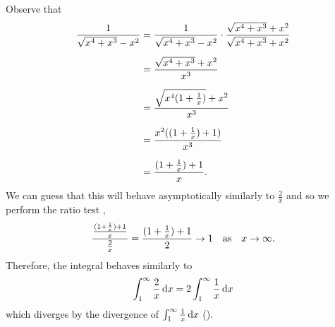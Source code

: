 \documentclass[../MathsNotesBase.tex]{subfiles}
\begin{document}
{\begin{exe}
{				Observe that
				\[\begin{aligned}
					\frac{1}{\sqrt{x^4 + x^3} - x^2} &= \frac{1}{\sqrt{x^4 + x^3} - x^2} \cdot \frac{\sqrt{x^4 + x^3} + x^2}{\sqrt{x^4 + x^3} + x^2} \nn
					&= \frac{\sqrt{x^4 + x^3} + x^2}{x^3} \nn
					&= \frac{\sqrt{x^4(1 + \frac{1}{x})} + x^2}{x^3} \nn
					&= \frac{x^2((1 + \frac{1}{x}) + 1)}{x^3} \nn
					&= \frac{(1 + \frac{1}{x}) + 1}{x}.
				\end{aligned}\]
				We can guess that this will behave asymptotically similarly to ${ \frac{2}{x} }$ and so we perform the ratio test \addref,
				\[ \frac{ \frac{(1 + \frac{1}{x}) + 1}{x} }{ \frac{2}{x} } = \frac{(1 + \frac{1}{x}) + 1}{2} \to 1 \hspace{10pt}\text{as}\hspace{10pt} x \to \infty. \]
				Therefore, the integral behaves similarly to
				\[ \int_1^\infty \frac{2}{x} \dif x = 2 \int_1^\infty \frac{1}{x} \dif x \]
				which diverges by the divergence of ${ \int_1^\infty \frac{1}{x} \dif x }$ (\addref).
			}
			\bigskip
			\label{ex:symmetric-improper-integral-of-odd-function}
		\end{exe}
	}


\end{document}
